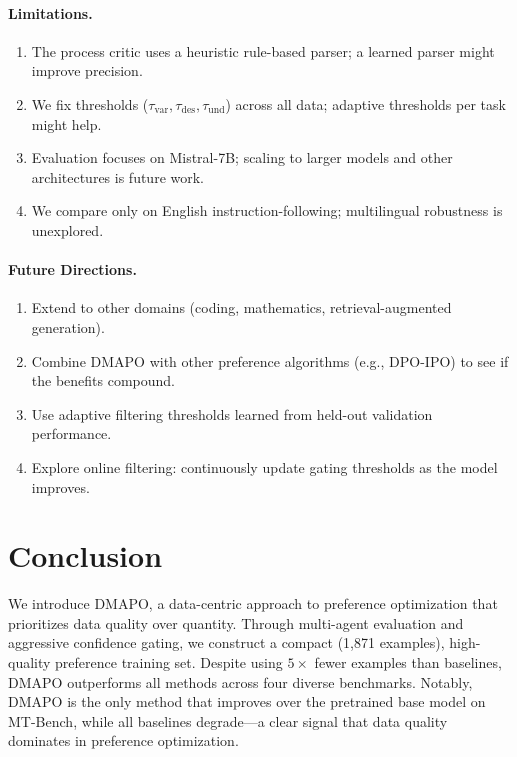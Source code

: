 \documentclass{article}
\newcommand{\ours}{\textsc{DMAPO}}
\begin{document}
\paragraph{Limitations.}
\begin{enumerate}[leftmargin=*,itemsep=0.5ex]
  \item The process critic uses a heuristic rule-based parser; a learned parser might improve precision.
  \item We fix thresholds ($\tau_{\text{var}}, \tau_{\text{des}}, \tau_{\text{und}}$) across all data; adaptive thresholds per task might help.
  \item Evaluation focuses on Mistral-7B; scaling to larger models and other architectures is future work.
  \item We compare only on English instruction-following; multilingual robustness is unexplored.
\end{enumerate}

\paragraph{Future Directions.}
\begin{enumerate}[leftmargin=*,itemsep=0.5ex]
  \item Extend to other domains (coding, mathematics, retrieval-augmented generation).
  \item Combine \ours{} with other preference algorithms (e.g., DPO-IPO) to see if the benefits compound.
  \item Use adaptive filtering thresholds learned from held-out validation performance.
  \item Explore online filtering: continuously update gating thresholds as the model improves.
\end{enumerate}


\section{Conclusion}
\label{sec:conclusion}

We introduce \ours{}, a data-centric approach to preference optimization that prioritizes data quality over quantity.
Through multi-agent evaluation and aggressive confidence gating, we construct a compact (1,871 examples), high-quality preference training set.
Despite using $5\times$ fewer examples than baselines, \ours{} outperforms all methods across four diverse benchmarks.
Notably, \ours{} is the only method that improves over the pretrained base model on MT-Bench, while all baselines degrade---a clear signal that data quality dominates in preference optimization.
\end{document}
